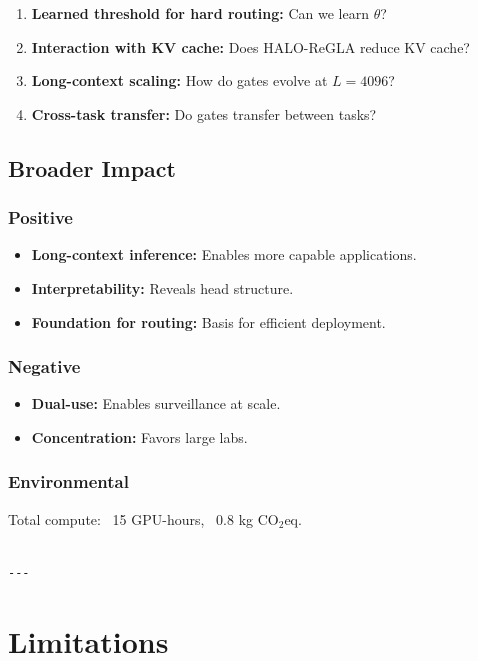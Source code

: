 \begin{enumerate}
\item \textbf{Learned threshold for hard routing:} Can we learn $\theta$?
\item \textbf{Interaction with KV cache:} Does HALO-ReGLA reduce KV cache?
\item \textbf{Long-context scaling:} How do gates evolve at $L = 4096$?
\item \textbf{Cross-task transfer:} Do gates transfer between tasks?

\end{enumerate}
\subsection{Broader Impact}

\subsubsection{Positive}
\begin{itemize}
\item \textbf{Long-context inference:} Enables more capable applications.
\item \textbf{Interpretability:} Reveals head structure.
\item \textbf{Foundation for routing:} Basis for efficient deployment.

\end{itemize}
\subsubsection{Negative}
\begin{itemize}
\item \textbf{Dual-use:} Enables surveillance at scale.
\item \textbf{Concentration:} Favors large labs.

\end{itemize}
\subsubsection{Environmental}
Total compute: ~15 GPU-hours, ~0.8 kg CO$_2$eq.
\begin{lstlisting}

---
\end{lstlisting}


\section{Limitations}

